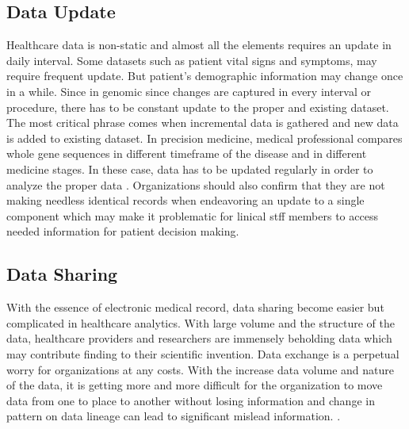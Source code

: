 \documentclass[sigconf]{acmart}
\begin{document}
\subsection{Data Update}Healthcare data is non-static and almost all the elements requires an update in daily interval.  Some datasets such as patient vital signs and symptoms, may require frequent update.  But patient’s demographic information may change once in a while. Since in genomic since changes are captured in every interval or procedure, there has to be constant update to the proper and existing dataset. The most critical phrase comes when incremental data is gathered and new data is added to existing dataset. In precision medicine, medical professional compares whole gene sequences in different timeframe of the disease and in different medicine stages. In these case, data has to be updated regularly in order to analyze the proper data \cite{editor0}.
Organizations should also confirm that they are not making needless identical records when endeavoring an update to a single component which may make it problematic for linical stff members to access needed information for patient decision making.


\subsection{Data Sharing}
With the essence of electronic medical record, data sharing become easier but complicated in healthcare analytics. With large volume and the structure of the data, healthcare providers and researchers are immensely beholding data which may contribute finding to their scientific invention. Data exchange is a perpetual worry for organizations at any costs. With the increase data volume and nature of the data, it is getting more and more difficult for the organization to move data from one to place to another without losing information and change in pattern on data lineage can lead to significant mislead information. \cite{editor07}. 
\end{document}
